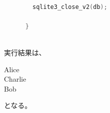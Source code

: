 \documentclass [11pt,a4paper,dvipdfmx] {jarticle}
\begin{document}
\begin{lstlisting}[language=C++]
                                                                                                                                                                                                                                                                                      
        sqlite3_close_v2(db);                                                                                                                                                                                                                                                         

      }                                                                                                                                                                                                                                                                               
                             
\end{lstlisting}
実行結果は、
\begin{screen}
    Alice\\
    Charlie\\
    Bob
\end{screen}
となる。
\end{document}
